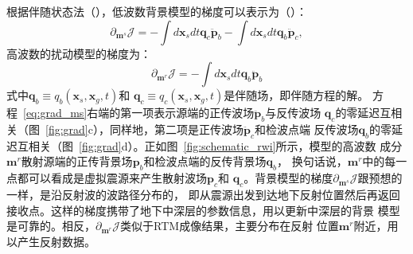 根据伴随状态法（），低波数背景模型的梯度可以表示为（）：
\begin{equation}
	\partial_{\mathbf{m}^s}\mathcal{J}=-\int d\mathbf{x}_sdt\mathbf{q}_c\ddot{\mathbf{p}}_b
	-\int d\mathbf{x}_sdt\mathbf{q}_b\ddot{\mathbf{p}}_c,
	\label{eq:grad_ms}
\end{equation}
高波数的扰动模型的梯度为：
\begin{equation}
	\partial_{\mathbf{m}^r}\mathcal{J}=-\int d\mathbf{x}_sdt\mathbf{q}_b\ddot{\mathbf{p}}_b
\end{equation}
式中$\mathbf{q}_b\equiv q_b(\mathbf{x}_s,\mathbf{x}_g,t)$和
$\mathbf{q}_c\equiv q_c(\mathbf{x}_s,\mathbf{x}_g,t)$是伴随场，即伴随方程的解。
方程~\ref{eq:grad_ms}右端的第一项表示源端的正传波场$\ddot{\mathbf{p}}_b$与反传波场
$\mathbf{q}_c$的零延迟互相关（图~\ref{fig:grad}c），同样地，第二项是正传波场$\ddot{\mathbf{p}}_c$和检波点端
反传波场$\mathbf{q}_b$的零延迟互相关（图~\ref{fig:grad}d）。正如图~\ref{fig:schematic_rwi}所示，模型的高波数
成分$\mathbf{m}^r$散射源端的正传背景场$\mathbf{p}_b$和检波点端的反传背景场$\mathbf{q}_b$，
换句话说，$\mathbf{m}^r$中的每一点都可以看成是虚拟震源来产生散射波场$\mathbf{p}_c$和
$\mathbf{q}_c$。背景模型的梯度$\partial_{\mathbf{m}^s}\mathcal{J}$跟预想的一样，是沿反射波的波路径分布的，
即从震源出发到达地下反射位置然后再返回接收点。这样的梯度携带了地下中深层的参数信息，用以更新中深层的背景
模型是可靠的。相反，$\partial_{\mathbf{m}^r}\mathcal{J}$类似于RTM成像结果，主要分布在反射
位置$\mathbf{m}^r$附近，用以产生反射数据。

\newpage
